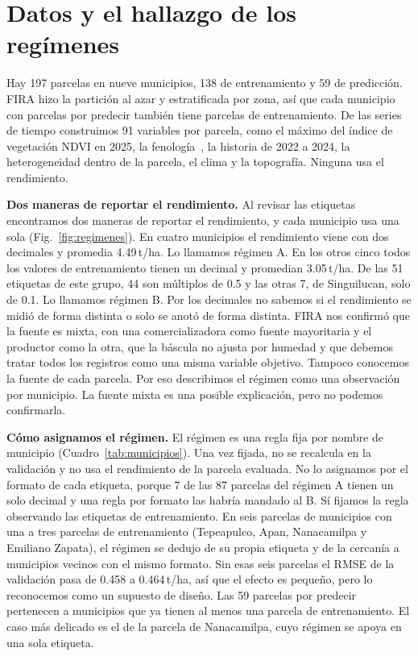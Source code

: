 \section{Datos y el hallazgo de los regímenes}\label{sec:datos}

Hay 197 parcelas en nueve municipios, 138 de entrenamiento y 59 de predicción. FIRA hizo la partición al azar y
estratificada por zona, así que cada municipio con parcelas por predecir también tiene parcelas de entrenamiento. De
las series de tiempo construimos 91 variables por parcela, como el máximo del índice de vegetación NDVI
en 2025, la fenología~\cite{zadoks1974}, la historia de 2022 a 2024, la heterogeneidad dentro de la parcela, el clima y
la topografía. Ninguna usa el rendimiento.

\textbf{Dos maneras de reportar el rendimiento.} Al revisar las etiquetas encontramos dos maneras de reportar el
rendimiento, y cada municipio usa una sola (Fig.~\ref{fig:regimenes}). En cuatro municipios el rendimiento viene con
dos decimales y promedia 4.49\,t/ha. Lo llamamos régimen A. En los otros cinco todos los valores de entrenamiento
tienen un decimal y promedian 3.05\,t/ha. De las 51 etiquetas de este grupo, 44 son múltiplos de 0.5 y las otras 7, de
Singuilucan, solo de 0.1. Lo llamamos régimen B. Por los decimales no sabemos si el rendimiento se midió de forma
distinta o solo se anotó de forma distinta. FIRA nos confirmó que la fuente es mixta, con una comercializadora como
fuente mayoritaria y el productor como la otra, que la báscula no ajusta por humedad y que debemos tratar todos los
registros como una misma variable objetivo. Tampoco conocemos la fuente de cada parcela. Por eso describimos el régimen
como una observación por municipio. La fuente mixta es una posible explicación, pero no podemos confirmarla.

\textbf{Cómo asignamos el régimen.} El régimen es una regla fija por nombre de municipio (Cuadro~\ref{tab:municipios}).
Una vez fijada, no se recalcula en la validación y no usa el rendimiento de la parcela evaluada. No lo asignamos por el
formato de cada etiqueta, porque 7 de las 87 parcelas del régimen A tienen un solo decimal y una regla por formato las
habría mandado al B. Sí fijamos la regla observando las etiquetas de entrenamiento. En seis parcelas de municipios con
una a tres parcelas de entrenamiento (Tepeapulco, Apan, Nanacamilpa y Emiliano Zapata), el régimen se dedujo de su
propia etiqueta y de la cercanía a municipios vecinos con el mismo formato. Sin esas seis parcelas el RMSE de la
validación pasa de 0.458 a 0.464\,t/ha, así que el efecto es pequeño, pero lo reconocemos como un supuesto de diseño.
Las 59 parcelas por predecir pertenecen a municipios que ya tienen al menos una parcela de entrenamiento. El caso más
delicado es el de la parcela de Nanacamilpa, cuyo régimen se apoya en una sola etiqueta.

